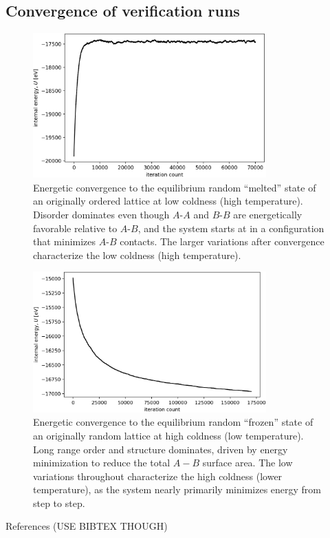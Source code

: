 \documentclass[10pt]{article}
\begin{document}
\subsection{Convergence of verification runs}

\begin{figure}[h!]
\centering
\includegraphics[width=0.80\textwidth]{Figures/verification_melted_convergence.png}
\caption{Energetic convergence to the equilibrium random ``melted'' state of an originally ordered lattice at low coldness (high temperature).
Disorder dominates even though $A$-$A$ and $B$-$B$ are energetically favorable relative to $A$-$B$, and the system starts at in a configuration that minimizes $A$-$B$ contacts.
The larger variations after convergence characterize the low coldness (high temperature).}
\label{fig:melted_convergence}
\end{figure}

\begin{figure}[h!]
\centering
\includegraphics[width=0.80\textwidth]{Figures/verification_frozen_convergence.png}
\caption{Energetic convergence to the equilibrium random ``frozen'' state of an originally random lattice at high coldness (low temperature).
Long range order and structure dominates, driven by energy minimization to reduce the total $A-B$ surface area.
The low variations throughout characterize the high coldness (lower temperature), as the system nearly primarily minimizes energy from step to step.}
\label{fig:frozen_convergence}
\end{figure}


\newpage

References (USE BIBTEX THOUGH)
\end{document}
